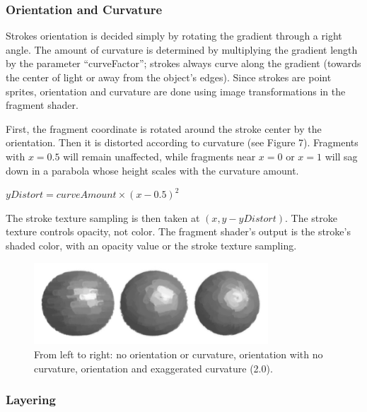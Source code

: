 \documentclass[conference]{acmsiggraph}
\begin{document}

\subsubsection{Orientation and Curvature}

Strokes orientation is decided simply by rotating the gradient through a right
angle. The amount of curvature is determined by multiplying the gradient length
by the parameter ``curveFactor''; strokes always curve along the gradient
(towards the center of light or away from the object's edges). Since strokes
are point sprites, orientation and curvature are done using image
transformations in the fragment shader.

First, the fragment coordinate is rotated around the stroke center by the
orientation. Then it is distorted according to curvature (see Figure 7).
Fragments with $x = 0.5$ will remain unaffected, while fragments near $x = 0$
or $x = 1$ will sag down in a parabola whose height scales with the curvature
amount.

$yDistort = curveAmount \times (x - 0.5)^2$

The stroke texture sampling is then taken at $(x, y - yDistort)$. The stroke
texture controls opacity, not color. The fragment shader's output is the
stroke's shaded color, with an opacity value or the stroke texture sampling.


\begin{figure}
  \centering
  \includegraphics[width=3.45in]{images/sphere_rotation_curve}
  \caption{From left to right: no orientation or curvature, orientation with
           no curvature, orientation and exaggerated curvature (2.0).}
\end{figure}


\subsubsection{Layering}
\end{document}
